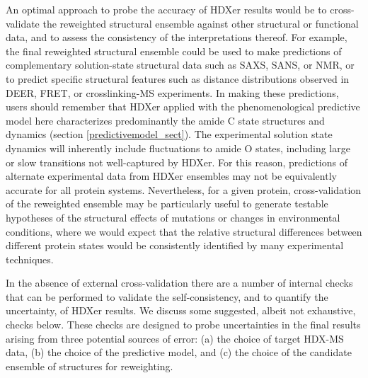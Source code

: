 \documentclass[9pt,tutorial]{livecoms}
\begin{document}
An optimal approach to probe the accuracy of HDXer results would be to cross-validate the reweighted structural ensemble against other structural or functional data, and to assess the consistency of the interpretations thereof.
For example, the final reweighted structural ensemble could be used to make predictions of complementary solution-state structural data such as SAXS, SANS, or NMR, or to predict specific structural features such as distance distributions observed in DEER, FRET, or crosslinking-MS experiments.
In making these predictions, users should remember that HDXer applied with the phenomenological predictive model here \cite{BestVendruscolo2006} characterizes predominantly the amide C state structures and dynamics (section \ref{predictivemodel_sect}).
The experimental solution state dynamics will inherently include fluctuations to amide O states, including large or slow transitions not well-captured by HDXer.
For this reason, predictions of alternate experimental data from HDXer ensembles may not be equivalently accurate for all protein systems. 
Nevertheless, for a given protein, cross-validation of the reweighted ensemble may be particularly useful to generate testable hypotheses of the structural effects of mutations or changes in environmental conditions, where we would expect that the relative structural differences between different protein states would be consistently identified by many experimental techniques.

In the absence of external cross-validation there are a number of internal checks that can be performed to validate the self-consistency, and to quantify the uncertainty, of HDXer results.
We discuss some suggested, albeit not exhaustive, checks below.
These checks are designed to probe uncertainties in the final results arising from three potential sources of error: (a) the choice of target HDX-MS data, (b) the choice of the predictive model, and (c) the choice of the candidate ensemble of structures for reweighting.
\end{document}
